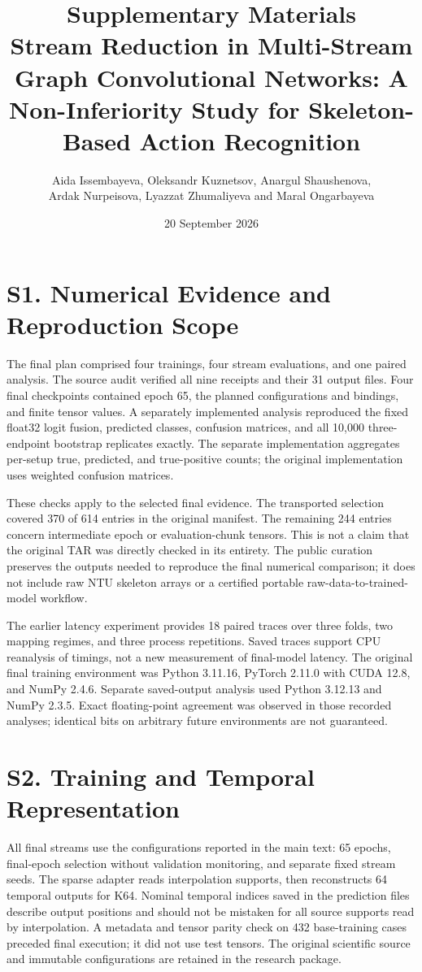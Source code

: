 \documentclass[10pt,a4paper]{article}
\title{Supplementary Materials\\\large Stream Reduction in Multi-Stream Graph Convolutional Networks: A Non-Inferiority Study for Skeleton-Based Action Recognition}
\author{Aida Issembayeva, Oleksandr Kuznetsov, Anargul Shaushenova,\\Ardak Nurpeisova, Lyazzat Zhumaliyeva and Maral Ongarbayeva}
\date{20 September 2026}
\begin{document}
\maketitle
\renewcommand{\thetable}{S\arabic{table}}
\section*{S1. Numerical Evidence and Reproduction Scope}
The final plan comprised four trainings, four stream evaluations, and one paired analysis. The source audit verified all nine receipts and their 31 output files. Four final checkpoints contained epoch 65, the planned configurations and bindings, and finite tensor values. A separately implemented analysis reproduced the fixed float32 logit fusion, predicted classes, confusion matrices, and all 10,000 three-endpoint bootstrap replicates exactly. The separate implementation aggregates per-setup true, predicted, and true-positive counts; the original implementation uses weighted confusion matrices.

These checks apply to the selected final evidence. The transported selection covered 370 of 614 entries in the original manifest. The remaining 244 entries concern intermediate epoch or evaluation-chunk tensors. This is not a claim that the original TAR was directly checked in its entirety. The public curation preserves the outputs needed to reproduce the final numerical comparison; it does not include raw NTU skeleton arrays or a certified portable raw-data-to-trained-model workflow.

The earlier latency experiment provides 18 paired traces over three folds, two mapping regimes, and three process repetitions. Saved traces support CPU reanalysis of timings, not a new measurement of final-model latency. The original final training environment was Python 3.11.16, PyTorch 2.11.0 with CUDA 12.8, and NumPy 2.4.6. Separate saved-output analysis used Python 3.12.13 and NumPy 2.3.5. Exact floating-point agreement was observed in those recorded analyses; identical bits on arbitrary future environments are not guaranteed.

\section*{S2. Training and Temporal Representation}
All final streams use the configurations reported in the main text: 65 epochs, final-epoch selection without validation monitoring, and separate fixed stream seeds. The sparse adapter reads interpolation supports, then reconstructs 64 temporal outputs for K64. Nominal temporal indices saved in the prediction files describe output positions and should not be mistaken for all source supports read by interpolation. A metadata and tensor parity check on 432 base-training cases preceded final execution; it did not use test tensors. The original scientific source and immutable configurations are retained in the research package.
\end{document}
